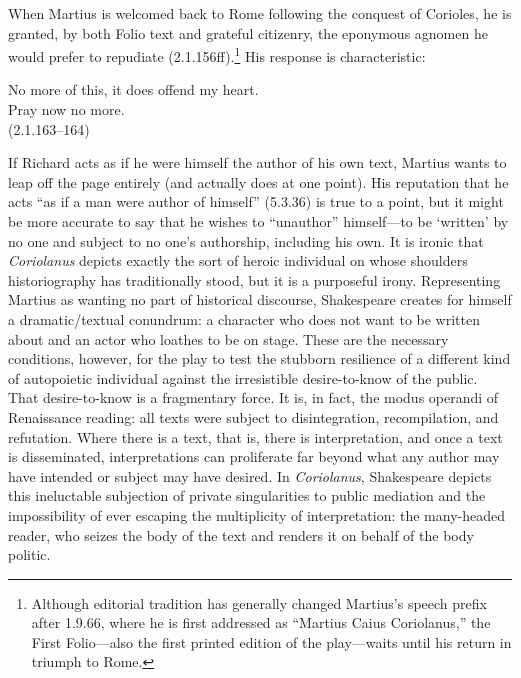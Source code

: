 When Martius is welcomed back to Rome following the conquest of Corioles, he is granted, by both Folio text and grateful citizenry, the eponymous agnomen he would prefer to repudiate (2.1.156ff).\footnote{Although editorial tradition has generally changed Martius's speech prefix after 1.9.66, where he is first addressed as ``Martius Caius Coriolanus,'' the First Folio---also the first printed edition of the play---waits until his return in triumph to Rome.}
His response is characteristic:
\begin{vq}
No more of this, it does offend my heart.\\
Pray now no more.\\
\hfill(2.1.163--164)
\end{vq}
If Richard acts as if he were himself the author of his own text, Martius wants to leap off the page entirely (and actually does at one point).
His reputation that he acts ``as if a man were author of himself'' (5.3.36) is true to a point, but it might be more accurate to say that he wishes to ``unauthor'' himself---to be ‘written' by no one and subject to no one's authorship, including his own.
It is ironic that \emph{Coriolanus} depicts exactly the sort of heroic individual on whose shoulders historiography has traditionally stood, but it is a purposeful irony.
Representing Martius as wanting no part of historical discourse, Shakespeare creates for himself a dramatic/textual conundrum: a character who does not want to be written about and an actor who loathes to be on stage.
These are the necessary conditions, however, for the play to test the stubborn resilience of a different kind of autopoietic individual against the irresistible desire-to-know of the public.
That desire-to-know is a fragmentary force.
It is, in fact, the modus operandi of Renaissance reading: all texts were subject to disintegration, recompilation, and refutation.
Where there is a text, that is, there is interpretation, and once a text is disseminated, interpretations can proliferate far beyond what any author may have intended or subject may have desired.
In \emph{Coriolanus}, Shakespeare depicts this ineluctable subjection of private singularities to public mediation and the impossibility of ever escaping the multiplicity of interpretation: the many-headed reader, who seizes the body of the text and renders it on behalf of the body politic.


